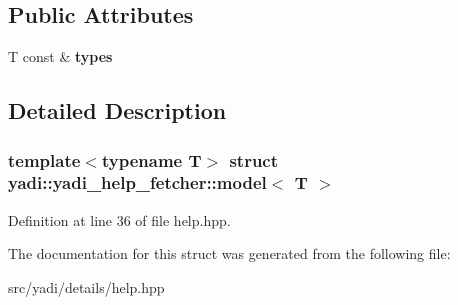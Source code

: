 \subsection*{Public Attributes}
\begin{DoxyCompactItemize}
\item 
\mbox{\label{structyadi_1_1yadi__help__fetcher_1_1model_a204cfb3830638c3ad9c9ddaf696d80e7}} 
T const  \& {\bfseries types}
\end{DoxyCompactItemize}


\subsection{Detailed Description}
\subsubsection*{template$<$typename T$>$\newline
struct yadi\+::yadi\+\_\+help\+\_\+fetcher\+::model$<$ T $>$}



Definition at line 36 of file help.\+hpp.



The documentation for this struct was generated from the following file\+:\begin{DoxyCompactItemize}
\item 
src/yadi/details/help.\+hpp\end{DoxyCompactItemize}
